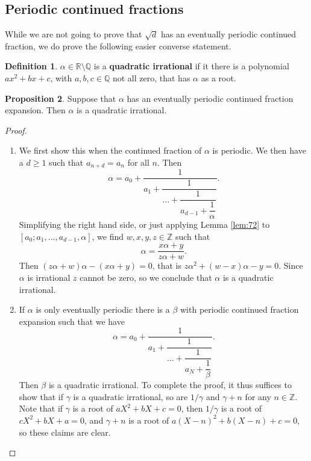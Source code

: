 \documentclass{article}
\newcommand{\Z}{\mathbb{Z}}
\newcommand{\Q}{\mathbb{Q}}
\newcommand{\R}{\mathbb{R}}
\newcommand{\rb}[1]{\left( #1 \right)}
\renewcommand{\sb}[1]{\left[ #1 \right]}
\theoremstyle{definition}\newtheorem{definition}{Definition}
\theoremstyle{definition}\newtheorem{remark}[definition]{Remark}
\theoremstyle{definition}\newtheorem*{example}{Example}
\theoremstyle{definition}\newtheorem*{note}{Note}
\newtheorem{proposition}[definition]{Proposition}
\begin{document}
\subsection{Periodic continued fractions}

While we are not going to prove that $ \sqrt{d} $ has an eventually periodic continued fraction, we do prove the following easier converse statement.

\begin{definition}
$ \alpha \in \R \setminus \Q $ is a \textbf{quadratic irrational} if it there is a polynomial $ ax^2 + bx + c $, with $ a, b, c \in \Q $ not all zero, that has $ \alpha $ as a root.
\end{definition}

\begin{proposition}
Suppose that $ \alpha $ has an eventually periodic continued fraction expansion. Then $ \alpha $ is a quadratic irrational.
\end{proposition}

\begin{proof}
\hfill
\begin{enumerate}
\item We first show this when the continued fraction of $ \alpha $ is periodic. We then have a $ d \ge 1 $ such that $ a_{n + d} = a_n $ for all $ n $. Then
$$ \alpha = a_0 + \dfrac{1}{a_1 + \dfrac{1}{\dots + \dfrac{1}{a_{d - 1} + \dfrac{1}{\alpha}}}}. $$
Simplifying the right hand side, or just applying Lemma \ref{lem:72} to $ \sb{a_0; a_1, \dots, a_{d - 1}, \alpha} $, we find $ w, x, y, z \in \Z $ such that
$$ \alpha = \dfrac{x\alpha + y}{z\alpha + w}. $$
Then $ \rb{z\alpha + w}\alpha - \rb{x\alpha + y} = 0 $, that is $ z\alpha^2 + \rb{w - x}\alpha - y = 0 $. Since $ \alpha $ is irrational $ z $ cannot be zero, so we conclude that $ \alpha $ is a quadratic irrational.
\item If $ \alpha $ is only eventually periodic there is a $ \beta $ with periodic continued fraction expansion such that we have
$$ \alpha = a_0 + \dfrac{1}{a_1 + \dfrac{1}{\dots + \dfrac{1}{a_N + \dfrac{1}{\beta}}}}. $$
Then $ \beta $ is a quadratic irrational. To complete the proof, it thus suffices to show that if $ \gamma $ is a quadratic irrational, so are $ 1 / \gamma $ and $ \gamma + n $ for any $ n \in \Z $. Note that if $ \gamma $ is a root of $ aX^2 + bX + c = 0 $, then $ 1 / \gamma $ is a root of $ cX^2 + bX + a = 0 $, and $ \gamma + n $ is a root of $ a\rb{X - n}^2 + b\rb{X - n} + c = 0 $, so these claims are clear.
\end{enumerate}
\end{proof}
\end{document}

